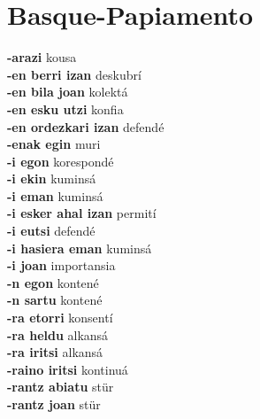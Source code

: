 \twocolumn
\chapter{Basque-Papiamento}
\small
{}\textbf{ -arazi  } kousa \\
\textbf{ -en berri izan  } deskubrí \\
\textbf{ -en bila joan  } kolektá \\
\textbf{ -en esku utzi  } konfia \\
\textbf{ -en ordezkari izan  } defendé \\
\textbf{ -enak egin  } muri \\
\textbf{ -i egon  } korespondé \\
\textbf{ -i ekin  } kuminsá \\
\textbf{ -i eman  } kuminsá \\
\textbf{ -i esker ahal izan  } permití \\
\textbf{ -i eutsi  } defendé \\
\textbf{ -i hasiera eman  } kuminsá \\
\textbf{ -i joan  } importansia \\
\textbf{ -n egon  } kontené \\
\textbf{ -n sartu  } kontené \\
\textbf{ -ra etorri  } konsentí \\
\textbf{ -ra heldu  } alkansá \\
\textbf{ -ra iritsi  } alkansá \\
\textbf{ -raino iritsi  } kontinuá \\
\textbf{ -rantz abiatu  } stür \\
\textbf{ -rantz joan  } stür \\

